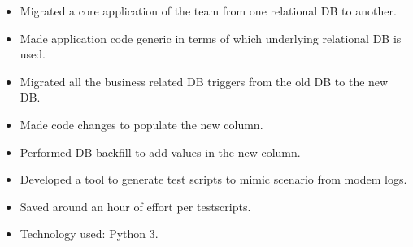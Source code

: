\documentclass[a4paper,11pt]{simpleresume}
\begin{document}
\begin{itemize}
    \item Migrated a core application of the team from one relational DB to another.
    \item Made application code generic in terms of which underlying relational DB is used.
    \item Migrated all the business related DB triggers from the old DB to the new DB.
\end{itemize}
\begin{itemize}
    \item Made code changes to populate the new column.
    \item Performed DB backfill to add values in the new column.
\end{itemize}
\begin{itemize}
    \item Developed a tool to generate test scripts to mimic scenario from modem logs.
    \item Saved around an hour of effort per testscripts.
    \item Technology used: Python 3.
\end{itemize}
\end{document}
